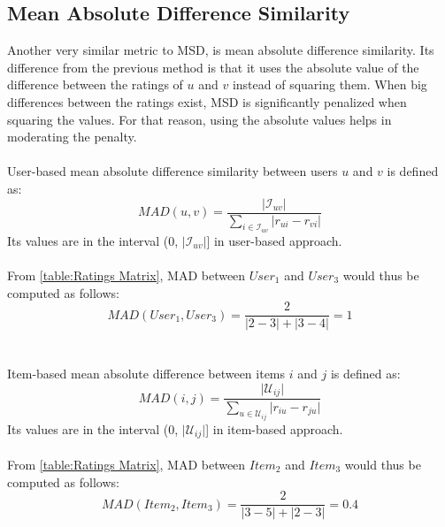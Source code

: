 \subsection{Mean Absolute Difference Similarity}
Another very similar metric to MSD, is mean absolute difference similarity.
Its difference from the previous method is that it uses the absolute value of
the difference between the ratings of $u$ and $v$ instead of squaring them.
When big differences between the ratings exist, MSD is significantly penalized when squaring the values.
For that reason, using the absolute values helps in moderating the penalty.\\\\
User-based mean absolute difference similarity between users $u$ and $v$ is defined as:
\begin{equation}\label{eq:mad}
    MAD(u,v) = \frac{\mathopen|\mathcal{I}_{uv}\mathclose|}
                    {\sum_{i \in \mathcal{I}_{uv}}\mathopen|r_{ui}-r_{vi}\mathclose|}
\end{equation}
Its values are in the
interval (0, $\mathopen|\mathcal{I}_{uv}\mathclose|$] in user-based approach.\\\\
From \autoref{table:Ratings Matrix}, MAD
between $User_1$ and $User_3$ would thus be computed as follows:
$$MAD(User_1,User_3) = \frac{2}{\mathopen|2 - 3\mathclose| + \mathopen|3 - 4\mathclose|} = 1$$\\\\
Item-based mean absolute difference between items $i$ and $j$ is defined as:
\begin{equation}
MAD(i,j) = \frac{\mathopen|\mathcal{U}_{ij}\mathclose|}
				{\sum_{u \in \mathcal{U}_{ij}}\mathopen|r_{iu}-r_{ju}\mathclose|}
\end{equation}
Its values are in the interval (0, $\mathopen|\mathcal{U}_{ij}\mathclose|$] in item-based approach.\\\\
From \autoref{table:Ratings Matrix}, MAD
between $Item_2$ and $Item_3$ would thus be computed as follows:
$$MAD(Item_2,Item_3) = \frac{2}{\mathopen|3 - 5\mathclose| + \mathopen|2 - 3\mathclose|} = 0.4$$\\
